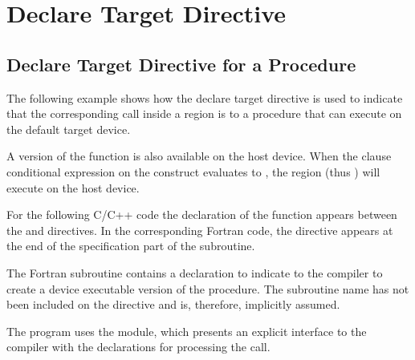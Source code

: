 \section{Declare Target Directive}
\label{sec:declare_target}


\subsection{Declare Target Directive for a Procedure}

\label{subsec:declare_target_function}



The following example shows how the declare target directive 
is used to indicate that the corresponding call inside a  region 
is to a  procedure that can execute on the default target device.

A version of the function is also available on the host device. When the  
clause conditional expression on the  construct evaluates to , 
the  region (thus ) will execute on the host device.

For the following C/C++ code the declaration of the function  appears between the 
 and  directives.
In the corresponding Fortran code, the  directive appears at the
end of the specification part of the subroutine.


The Fortran  subroutine contains a  declaration
to indicate to the compiler to create a device executable version of the procedure. 
The subroutine name has not been included on the 
directive and is, therefore, implicitly assumed.

The program uses the  module, which presents an explicit interface to 
the compiler with the  declarations for processing
the  call.

